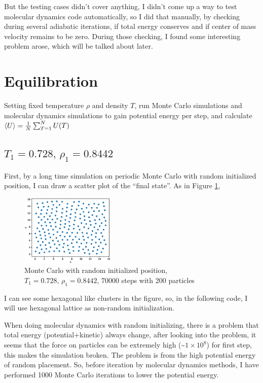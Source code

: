 \documentclass[UTF8,a4paper,no-math]{article}
\begin{document}
But the testing cases didn't cover anything, I didn't come up a way to test molecular dynamics code automatically, so I did that manually, by checking during several adiabatic iterations, if total energy conserves and if center of mass velocity remains to be zero. During
those checking, I found some interesting problem arose, which will be talked about later.

\section{Equilibration}
Setting fixed temperature $\rho$ and density $T$, run Monte Carlo simulations and molecular dynamics simulations to gain potential energy per step, and calculate
$\expval{U} = \frac{1}{N}\sum_{T=1}^N U(T)$
\subsection{$T_1 =0.728,\, \rho_1 = 0.8442$}
First, by a long time simulation on periodic Monte Carlo with random initialized position, I can draw a scatter plot of the ``final state''. As in Figure \ref{fig:scatter},
\begin{figure}[h]
	\centering
	\includegraphics[width=0.4\textwidth]{fig/rand_scatter_70000_steps_200_particles_0.8442_rho_0.728_tempure_.eps}
	\caption{Monte Carlo with random initialized position, $T_1 =0.728,\, \rho_1 = 0.8442$, 70000 steps with 200 particles}
	\label{fig:scatter}
\end{figure}
I can see some hexagonal like clusters in the figure, so, in the following code, I will use hexagonal lattice as non-random initialization.

When doing molecular dynamics with random initializing, there is a problem that total energy (potential+kinetic) always change, after looking into the problem, it seems that the force on
particles can be extremely high (\~$1\times 10^{8}$) for first step, this makes the simulation broken. The problem is from the high potential energy of random placement. So, before iteration by
molecular dynamics methods, I have performed 1000 Monte Carlo iterations to lower the potential energy.
\end{document}

